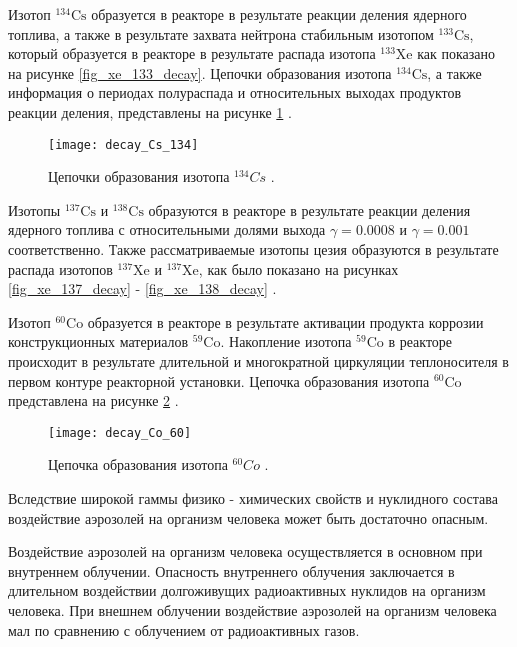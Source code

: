 Изотоп $^{134}\text{Cs}$ образуется в реакторе в результате реакции деления ядерного топлива, а также в результате 
захвата нейтрона стабильным изотопом $^{133}\text{Cs}$, который образуется в реакторе в результате распада изотопа 
$^{133}\text{Xe}$ как показано на рисунке \ref{fig_xe_133_decay}. Цепочки образования изотопа $^{134}\text{Cs}$, а также 
информация о периодах полураспада и относительных выходах продуктов реакции деления, представлены на рисунке 
\ref{fig_Cs_134_decay} \cite{gusev_bio}.

\begin{figure}[ht!]
    \centering
    \texttt{[image: decay\_Cs\_134]}
    \captionsetup{justification=centering}
    \caption{Цепочки образования изотопа $^{134}Cs$ \cite{periodic_table}.}
    \label{fig_Cs_134_decay}
\end{figure}

Изотопы $^{137}\text{Cs}$ и $^{138}\text{Cs}$ образуются в реакторе в результате реакции деления ядерного топлива с 
относительными долями выхода $\gamma=0.0008$ и $\gamma=0.001$ соответственно. Также рассматриваемые изотопы цезия 
образуются в результате распада изотопов $^{137}\text{Xe}$ и $^{137}\text{Xe}$, как было показано на рисунках 
\ref{fig_xe_137_decay} - \ref{fig_xe_138_decay} \cite{gusev_bio}.

Изотоп $^{60}\text{Co}$ образуется в реакторе в результате активации продукта коррозии конструкционных материалов 
$^{59}\text{Co}$. Накопление изотопа $^{59}\text{Co}$ в реакторе происходит в результате длительной и многократной 
циркуляции теплоносителя в первом контуре реакторной установки. Цепочка образования изотопа $^{60}\text{Co}$ 
представлена на рисунке \ref{fig_Co_60_decay} \cite{gusev_bio}.

\begin{figure}[ht!]
    \centering
    \texttt{[image: decay\_Co\_60]}
    \captionsetup{justification=centering}
    \caption{Цепочка образования изотопа $^{60}Co$ \cite{periodic_table}.}
    \label{fig_Co_60_decay}
\end{figure}

Вследствие широкой гаммы физико - химических свойств и нуклидного состава воздействие аэрозолей на организм человека 
может быть достаточно опасным. 

Воздействие аэрозолей на организм человека осуществляется в основном при внутреннем облучении. Опасность внутреннего 
облучения заключается в длительном воздействии долгоживущих радиоактивных нуклидов на организм человека. При внешнем 
облучении воздействие аэрозолей на организм человека мал по сравнению с облучением от радиоактивных газов.

